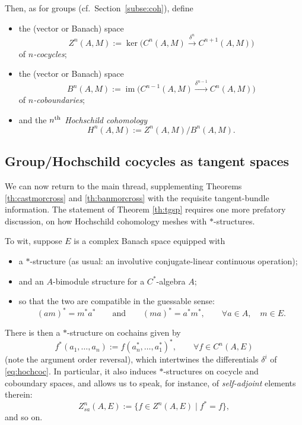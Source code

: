 \documentclass[10pt,a4paper]{amsart}
\numberwithin{equation}{section}
\DeclareMathOperator{\im}{\mathrm{im}}
\begin{document}
Then, as for groups (cf.\ Section~\ref{subse:coh}), define
\begin{itemize}\itemsep=0pt
\item the (vector or Banach) space
 \begin{equation*}
 Z^n(A,M):=\ker\big(C^n(A,M)\xrightarrow{\delta^n}C^{n+1}(A,M)\big)
 \end{equation*}
 of {\it $n$-cocycles};
\item the (vector or Banach) space
 \begin{equation*}
 B^n(A,M):=\im\big(C^{n-1}(A,M)\xrightarrow{\delta^{n-1}}C^{n}(A,M)\big)
 \end{equation*}
 of {\it $n$-coboundaries};
\item and the {\it $n^{\rm th}$ Hochschild cohomology}
 \begin{equation*}
 H^n(A,M):=Z^n(A,M)/B^n(A,M).
 \end{equation*}
\end{itemize}

\subsection{Group/Hochschild cocycles as tangent spaces}\label{subse:cocytg}

We can now return to the main thread, supplementing Theorems \ref{th:castmorcross} and \ref{th:banmorcross} with the requisite tangent-bundle information. The statement of Theorem \ref{th:tgsp} requires one more prefatory discussion, on how Hochschild cohomology meshes with $*$-structures.

To wit, suppose $E$ is a complex Banach space equipped with
\begin{itemize}\itemsep=0pt
\item a $*$-structure (as usual: an involutive conjugate-linear continuous operation);
\item and an $A$-bimodule structure for a $C^*$-algebra $A$;
\item so that the two are compatible in the guessable sense:
 \begin{equation*}
 (am)^* = m^* a^*
 \qquad\text{and}\qquad
 (ma)^* = a^* m^*,\qquad \forall a\in A,\quad m\in E.
 \end{equation*}
\end{itemize}
There is then a $*$-structure on cochains given by
\begin{equation*}
 f^*(a_1, \dots, a_n):=f(a_n^*, \dots, a_1^*)^*,\qquad \forall f\in C^n(A,E)
\end{equation*}
(note the argument order reversal), which intertwines the differentials $\delta^i$ of \eqref{eq:hochcoc}. In particular, it also induces $*$-structures on cocycle and coboundary spaces, and allows us to speak, for instance, of {\it self-adjoint} elements therein:
\begin{equation*}
 Z_{sa}^n(A,E):=\{f\in Z^n(A,E)\mid f^*=f\},
\end{equation*}
and so on.
\end{document}
